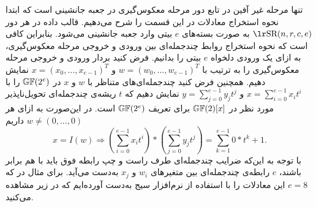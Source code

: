 تنها مرحله غیر آفین در تابع دور 
مرحله معکوس‌گیری در جعبه جانشینی است که ابتدا نحوه استخراج معادلات در این قسمت را شرح می‌دهیم. قالب داده در هر دور 
$\text{\en{SR}}(n,r,c,e)$
به صورت بسته‌های 
$e$
بیتی وارد جعبه جانشینی می‌شود. بنابراین کافی است که نحوه استخراج روابط چندجمله‌ای بین ورودی و خروجی مرحله معکوس‌گیری، به ازای یک ورودی دلخواه 
$e$
بیتی را بدانیم. فرض کنید بردار ورودی و خروجی مرحله معکوس‌گیری را به ترتیب با 
$w = (w_{0},\ldots,w_{e-1})^{T}$
و 
$x = (x_{0},\ldots,x_{e-1})^{T}$
نمایش دهیم. همچنین فرض کنید چندجمله‌ای‌های متناظر با 
$w$
و 
$x$
در 
$\mathbb{GF}(2^{e})$
را با 
$x = \sum_{i = 0}^{e-1}x_{i}t^{i}$
و
$y = \sum_{j = 0}^{e-1}y_{j}t^{j}$
نمایش دهیم که 
$t$
ریشه‌ی چندجمله‌ای تحویل‌ناپذیر مورد نظر در 
$\mathbb{GF}(2)[x]$
 برای تعریف 
$\mathbb{GF}(2^{e})$
است. در این‌صورت به ازای هر 
$w\neq (0,\ldots,0)$
داریم
$$x = I(w)\Rightarrow (\sum_{i = 0}^{e-1}x_{i}t^{i})*(\sum_{j = 0}^{e-1}y_{j}t^{j}) = \sum_{k = 1}^{e-1}0*t^{k} + 1.$$
با توجه به این‌که ضرایب چند‌جمله‌ای طرف راست و چپ رابطه فوق باید با هم برابر باشند، 
$e$
رابطه‌ی چندجمله‌ای بین متغیرهای 
$w_{i}$
و
$x_{j}$
به‌دست می‌آید. برای مثال در 
که 
$e = 8$
این معادلات را با استفاده از نرم‌افزار سیج به‌دست آورده‌ایم که در زیر مشاهده می‌کنید.
